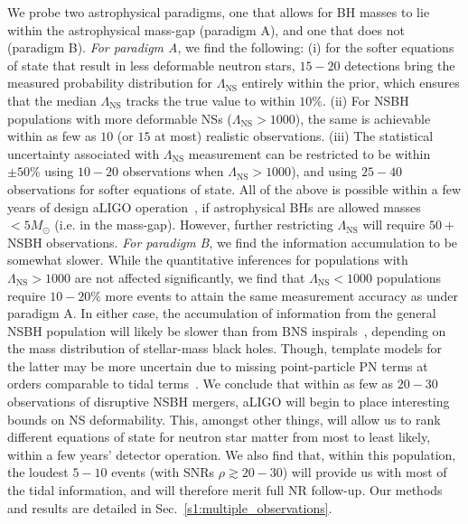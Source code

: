 \documentclass[aps,prd,amsmath,floats,floatfix, twocolumn,
superscriptaddress,nofootinbib,showpacs]{revtex4-1}
\newcommand{\lambdans}{\Lambda_\mathrm{NS}}
\begin{document}
We probe two astrophysical paradigms, one that allows for BH masses to lie
within the astrophysical mass-gap (paradigm A), and one that does not (paradigm
B).
% 
{\it For paradigm A}, we find the following: (i) for the softer equations of
state that result in less deformable neutron stars, $15-20$ detections bring
the measured probability distribution for $\lambdans$ entirely within the prior,
which ensures that the median $\lambdans$ tracks the true value to within $10\%$.
(ii) For NSBH populations with more deformable NSs ($\lambdans> 1000$),
the same is achievable within as few as $10$ (or $15$ at most) realistic
observations. (iii) The statistical uncertainty associated with $\lambdans$
measurement can be restricted to be within $\pm50\%$ using $10-20$ observations
when $\lambdans> 1000$), and using $25-40$ observations for softer equations
of state. All of the above is possible within a few years of design
aLIGO operation~\cite{Abadie:2010cfa}, if astrophysical BHs are allowed
masses $< 5M_\odot$ (i.e. in the mass-gap). However, further
restricting $\lambdans$ will require $50+$ NSBH observations.
% 
{\it For paradigm B}, we find the information accumulation to be somewhat slower.
While the quantitative inferences for populations with $\lambdans>1000$ are
not affected significantly, we find that $\lambdans< 1000$ populations require 
$10-20\%$ more events to attain the same measurement accuracy as under
paradigm A. In either case, the accumulation of information from the general
NSBH population will likely be slower than from BNS inspirals~\cite{Mandel:2009pc,
Lackey2014,Wade:2014vqa,Agathos:2015a}, depending on the mass distribution of 
stellar-mass black holes. Though, template models for the latter may be more
uncertain due to missing point-particle PN terms at orders comparable to
tidal terms~\cite{Lackey2014}.
% 
We conclude that within as few as $20-30$ observations of disruptive NSBH
mergers, aLIGO will begin to place interesting bounds on NS deformability.
This, amongst other things, will allow us to rank different equations of 
state for neutron star matter from most to least likely, within a few years'
detector operation.
% 
We also find that, within this population, the loudest $5-10$ events (with SNRs
$\rho\gtrsim 20-30$) will provide us with most of the tidal information,
and will therefore merit full NR follow-up.
% 
Our methods and results are detailed in Sec.~\ref{s1:multiple_observations}.
\end{document}
